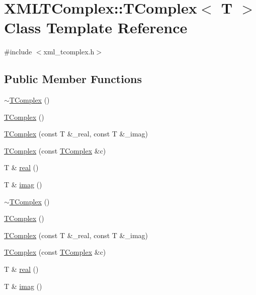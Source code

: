 \hypertarget{classXMLTComplex_1_1TComplex}{}\section{X\+M\+L\+T\+Complex\+:\+:T\+Complex$<$ T $>$ Class Template Reference}
\label{classXMLTComplex_1_1TComplex}


{\ttfamily \#include $<$xml\+\_\+tcomplex.\+h$>$}

\subsection*{Public Member Functions}
\begin{DoxyCompactItemize}
\item 
\mbox{\hyperlink{classXMLTComplex_1_1TComplex_ac5ecd1b7db17431803816caf30e4ddc1}{$\sim$\+T\+Complex}} ()
\item 
\mbox{\hyperlink{classXMLTComplex_1_1TComplex_a14dd2bcde2b707f8040fbf68bf3c0266}{T\+Complex}} ()
\item 
\mbox{\hyperlink{classXMLTComplex_1_1TComplex_a004b4c926f786993fbcc127c01841cd2}{T\+Complex}} (const T \&\+\_\+real, const T \&\+\_\+imag)
\item 
\mbox{\hyperlink{classXMLTComplex_1_1TComplex_a8c19071c0c720ddbcf4232418b8b4a19}{T\+Complex}} (const \mbox{\hyperlink{classXMLTComplex_1_1TComplex}{T\+Complex}} \&c)
\item 
T \& \mbox{\hyperlink{classXMLTComplex_1_1TComplex_a3f7e9b8dd1c6a18da9a944d51d8118c9}{real}} ()
\item 
T \& \mbox{\hyperlink{classXMLTComplex_1_1TComplex_af991451a5500d81f96df2a39d70d7196}{imag}} ()
\item 
\mbox{\hyperlink{classXMLTComplex_1_1TComplex_ac5ecd1b7db17431803816caf30e4ddc1}{$\sim$\+T\+Complex}} ()
\item 
\mbox{\hyperlink{classXMLTComplex_1_1TComplex_a14dd2bcde2b707f8040fbf68bf3c0266}{T\+Complex}} ()
\item 
\mbox{\hyperlink{classXMLTComplex_1_1TComplex_a004b4c926f786993fbcc127c01841cd2}{T\+Complex}} (const T \&\+\_\+real, const T \&\+\_\+imag)
\item 
\mbox{\hyperlink{classXMLTComplex_1_1TComplex_a8c19071c0c720ddbcf4232418b8b4a19}{T\+Complex}} (const \mbox{\hyperlink{classXMLTComplex_1_1TComplex}{T\+Complex}} \&c)
\item 
T \& \mbox{\hyperlink{classXMLTComplex_1_1TComplex_a3f7e9b8dd1c6a18da9a944d51d8118c9}{real}} ()
\item 
T \& \mbox{\hyperlink{classXMLTComplex_1_1TComplex_af991451a5500d81f96df2a39d70d7196}{imag}} ()
\end{DoxyCompactItemize}


